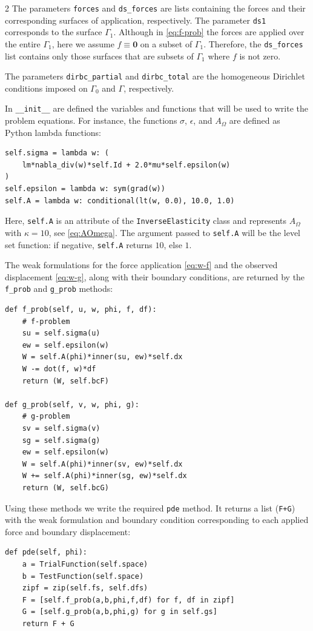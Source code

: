 \documentclass[a4paper, oneside]{article}
\newcommand{\code}[1]{\texttt{#1}}
\begin{document}
\begin{multicols}{2}
The parameters \code{forces} and \code{ds\_forces} are lists
containing the forces and their corresponding surfaces of application, respectively.
The parameter \code{ds1} corresponds to the surface $\Gamma_1$.
Although in \eqref{eq:f-prob} the forces are applied over the entire $\Gamma_1$,
here we assume $f\equiv\textbf{0}$ on a subset of $\Gamma_1$.
Therefore, the \code{ds\_forces} list contains only those surfaces
that are subsets of $\Gamma_1$ where $f$ is not zero.

The parameters \code{dirbc\_partial} and \code{dirbc\_total} are
the homogeneous Dirichlet conditions imposed on $\Gamma_0$ and $\Gamma$,
respectively.

In \code{\_\_init\_\_} are defined the variables and functions
that will be used to write the problem equations.
For instance, the functions $\sigma$, $\epsilon$, and $A_\Omega$
are defined as Python lambda functions:
\begin{lstlisting}
self.sigma = lambda w: (
	lm*nabla_div(w)*self.Id + 2.0*mu*self.epsilon(w)
)
self.epsilon = lambda w: sym(grad(w))
self.A = lambda w: conditional(lt(w, 0.0), 10.0, 1.0)
\end{lstlisting}
Here, \code{self.A} is an attribute of the \code{InverseElasticity} class
and represents $A_\Omega$ with $\kappa = 10$, see \eqref{eq:AOmega}.
The argument passed to \code{self.A} will be the level set function:
if negative, \code{self.A} returns $10$, else $1$.

The weak formulations for the force application \eqref{eq:w-f} and
the observed displacement \eqref{eq:w-g},
along with their boundary conditions, are returned
by the \code{f\_prob} and \code{g\_prob} methods:
\begin{lstlisting}
def f_prob(self, u, w, phi, f, df):
	# f-problem
	su = self.sigma(u)
	ew = self.epsilon(w)
	W = self.A(phi)*inner(su, ew)*self.dx
	W -= dot(f, w)*df
	return (W, self.bcF)

def g_prob(self, v, w, phi, g):
	# g-problem
	sv = self.sigma(v)
	sg = self.sigma(g)
	ew = self.epsilon(w)
	W = self.A(phi)*inner(sv, ew)*self.dx
	W += self.A(phi)*inner(sg, ew)*self.dx
	return (W, self.bcG)
\end{lstlisting}

Using these methods we write the required \code{pde} method.
It returns a list (\code{F+G}) with the weak formulation
and boundary condition corresponding
to each applied force and boundary displacement:
\begin{lstlisting}
def pde(self, phi):
	a = TrialFunction(self.space)
	b = TestFunction(self.space)
	zipf = zip(self.fs, self.dfs)
	F = [self.f_prob(a,b,phi,f,df) for f, df in zipf]
	G = [self.g_prob(a,b,phi,g) for g in self.gs]
	return F + G
\end{lstlisting}


\end{multicols}
\end{document}
